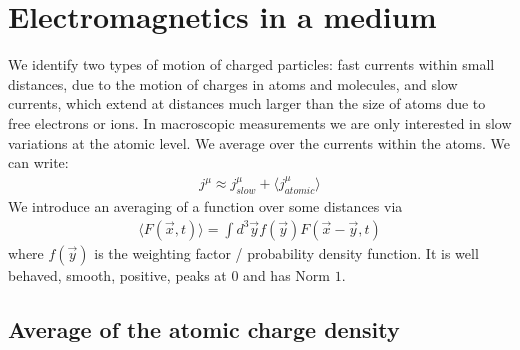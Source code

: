 \section{Electromagnetics in a medium}

We identify two types of motion of charged particles: fast currents within small
distances, due to the motion of charges in atoms and molecules, and slow currents,
which extend at distances much larger than the size of atoms due to free electrons
or ions. In macroscopic measurements we are only interested in slow variations at
the atomic level. We average over the currents within the atoms. We can write:
\begin{align*}
    j^\mu  \approx j_{slow}^\mu + \langle j_{atomic}^\mu \rangle
\end{align*}
We introduce an averaging of a function over some distances via
\begin{align*}
    \langle F(\vec{x},t) \rangle = \int d^3 \vec{y} f(\vec{y}) F(\vec{x}-\vec{y},t)
\end{align*}
where $f(\vec{y})$ is the weighting factor / probability density function. It
is well behaved, smooth, positive, peaks at $0$ and has Norm $1$.

\subsection{Average of the atomic charge density}

